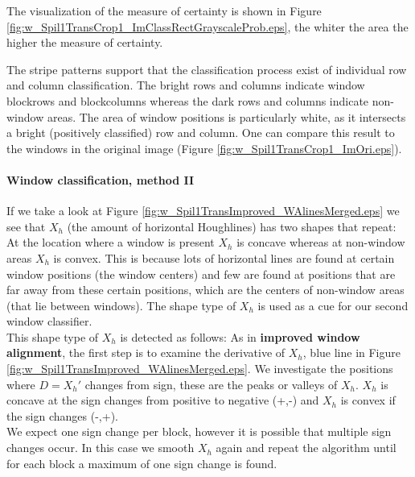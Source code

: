 
The visualization of the measure of certainty is shown in Figure
\ref{fig:w_Spil1TransCrop1_ImClassRectGrayscaleProb.eps},  
the whiter the area the higher the measure of certainty.

The stripe patterns support that the classification process exist of individual row and column classification.
The bright rows and columns indicate window blockrows and blockcolumns
whereas the dark rows and columns indicate non-window areas.
The area of window positions is particularly white, as it 
intersects a bright (positively classified) row and column.
One can compare this result to the windows in the original image 
(Figure \ref{fig:w_Spil1TransCrop1_ImOri.eps}).


\paragraph{Window classification, method II}
If we take a look at Figure \ref{fig:w_Spil1TransImproved_WAlinesMerged.eps}
we see that $X_h$ (the amount of horizontal Houghlines) has two shapes that
repeat:  At the location where a window is present $X_h$ is concave whereas at
non-window areas $X_h$ is convex. This is because lots of
horizontal lines are found at certain window positions (the window centers) and few
are found at positions that are far away from these certain positions, which are the
centers of non-window areas (that lie between windows).  The shape type of $X_h$ is
used as a cue for our second window classifier.\\

This shape type of $X_h$ is detected as follows:
As in \textbf{improved window alignment}, the first step is to examine the derivative of $X_h$, blue line in Figure \ref{fig:w_Spil1TransImproved_WAlinesMerged.eps}.
We investigate the positions where $D=X_{h}'$ changes from sign, these are the peaks or valleys of $X_h$. $X_h$ is concave at the sign changes from positive to negative (+,-) and $X_h$ is convex if the sign changes (-,+).\\

We expect one sign change per block, however it is possible that multiple sign changes occur. In this case we smooth $X_h$ again and repeat the algorithm until for each block a maximum of one sign change is found. \\

